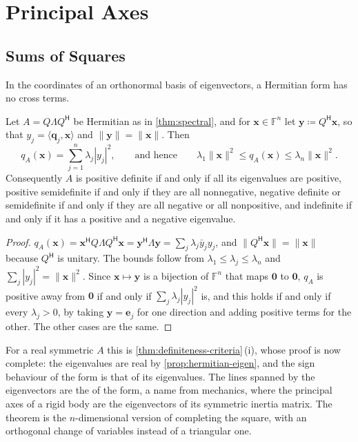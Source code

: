 \section{Principal Axes}
\label{sec:principal-axes}

\subsection{Sums of Squares}

In the coordinates of an orthonormal basis of eigenvectors, a Hermitian form has no cross terms.

\begin{theorem}
\label{thm:principal-axes}
Let $A=Q\Lambda Q^{\mathsf H}$ be Hermitian as in \cref{thm:spectral}, and for $\mathbf x\in\mathbb F^n$ let $\mathbf y\coloneqq Q^{\mathsf H}\mathbf x$, so that $y_j=\langle\mathbf q_j,\mathbf x\rangle$ and $\|\mathbf y\|=\|\mathbf x\|$. Then
\[
q_A(\mathbf x)=\sum_{j=1}^n\lambda_j|y_j|^2,\qquad\text{and hence}\qquad\lambda_1\|\mathbf x\|^2\le q_A(\mathbf x)\le\lambda_n\|\mathbf x\|^2 .
\]
Consequently $A$ is positive definite if and only if all its eigenvalues are positive, positive semidefinite if and only if they are all nonnegative, negative definite or semidefinite if and only if they are all negative or all nonpositive, and indefinite if and only if it has a positive and a negative eigenvalue.
\end{theorem}

\begin{proof}
$q_A(\mathbf x)=\mathbf x^{\mathsf H}Q\Lambda Q^{\mathsf H}\mathbf x=\mathbf y^{\mathsf H}\Lambda\mathbf y=\sum_j\lambda_j\bar y_jy_j$, and $\|Q^{\mathsf H}\mathbf x\|=\|\mathbf x\|$ because $Q^{\mathsf H}$ is unitary. The bounds follow from $\lambda_1\le\lambda_j\le\lambda_n$ and $\sum_j|y_j|^2=\|\mathbf x\|^2$. Since $\mathbf x\mapsto\mathbf y$ is a bijection of $\mathbb F^n$ that maps $\mathbf 0$ to $\mathbf 0$, $q_A$ is positive away from $\mathbf 0$ if and only if $\sum_j\lambda_j|y_j|^2$ is, and this holds if and only if every $\lambda_j>0$, by taking $\mathbf y=\mathbf e_j$ for one direction and adding positive terms for the other. The other cases are the same.
\end{proof}

For a real symmetric $A$ this is \cref{thm:definiteness-criteria}\,(i), whose proof is now complete: the eigenvalues are real by \cref{prop:hermitian-eigen}, and the sign behaviour of the form is that of its eigenvalues. The lines spanned by the eigenvectors are the  of the form, a name from mechanics, where the principal axes of a rigid body are the eigenvectors of its symmetric inertia matrix. The theorem is the $n$-dimensional version of completing the square, with an orthogonal change of variables instead of a triangular one.

